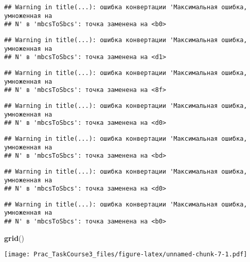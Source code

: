 \documentclass[
]{article}
\newenvironment{Shaded}{\begin{snugshade}}{\end{snugshade}}
\newcommand{\FunctionTok}[1]{\textcolor[rgb]{0.13,0.29,0.53}{\textbf{#1}}}
\newcommand{\NormalTok}[1]{#1}
\begin{document}
\begin{verbatim}
## Warning in title(...): ошибка конвертации 'Максимальная ошибка, умноженная на
## N' в 'mbcsToSbcs': точка заменена на <b0>
\end{verbatim}

\begin{verbatim}
## Warning in title(...): ошибка конвертации 'Максимальная ошибка, умноженная на
## N' в 'mbcsToSbcs': точка заменена на <d1>
\end{verbatim}

\begin{verbatim}
## Warning in title(...): ошибка конвертации 'Максимальная ошибка, умноженная на
## N' в 'mbcsToSbcs': точка заменена на <8f>
\end{verbatim}

\begin{verbatim}
## Warning in title(...): ошибка конвертации 'Максимальная ошибка, умноженная на
## N' в 'mbcsToSbcs': точка заменена на <d0>
\end{verbatim}

\begin{verbatim}
## Warning in title(...): ошибка конвертации 'Максимальная ошибка, умноженная на
## N' в 'mbcsToSbcs': точка заменена на <bd>
\end{verbatim}

\begin{verbatim}
## Warning in title(...): ошибка конвертации 'Максимальная ошибка, умноженная на
## N' в 'mbcsToSbcs': точка заменена на <d0>
\end{verbatim}

\begin{verbatim}
## Warning in title(...): ошибка конвертации 'Максимальная ошибка, умноженная на
## N' в 'mbcsToSbcs': точка заменена на <b0>
\end{verbatim}

\begin{Shaded}
\begin{Highlighting}[]
\FunctionTok{grid}\NormalTok{()}
\end{Highlighting}
\end{Shaded}

\texttt{[image: Prac\_TaskCourse3\_files/figure-latex/unnamed-chunk-7-1.pdf]}
\end{document}
